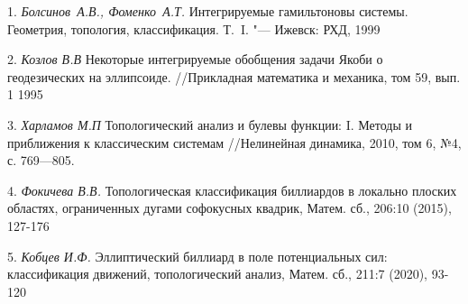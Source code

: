 \litlist

1. {\it Болсинов~А.В., Фоменко~А.Т.} Интегрируемые гамильтоновы системы. Геометрия, топология, классификация. Т.~{I}. "--- Ижевск: РХД, 1999

2. {\it Козлов В.В} Некоторые интегрируемые обобщения задачи Якоби о геодезических на эллипсоиде. //Прикладная математика и механика, том 59, вып. 1 1995

3. {\it Харламов М.П} Топологический анализ и булевы функции: {I}. Методы и приближения к классическим системам //Нелинейная динамика, 2010, том 6, №4, с. 769---805.

4. {\it Фокичева В.В.} Топологическая классификация биллиардов в локально плоских областях, ограниченных дугами софокусных квадрик, Матем. сб., 206:10 (2015), 127-176

5. {\it Кобцев И.Ф.} Эллиптический биллиард в поле потенциальных сил: классификация движений, топологический анализ, Матем. сб., 211:7 (2020), 93-120
